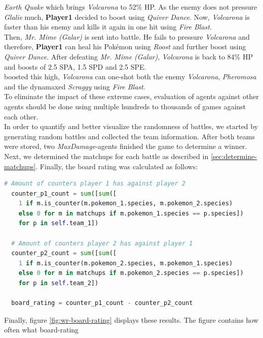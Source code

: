 \textit{Earth Quake} which brings \textit{Volcarona} to 52\% \ac{HP}. As the enemy does not pressure
\textit{Glalie} much, \textbf{Player1} decided to boost using \textit{Quiver Dance}. Now, \textit{Volcarona}
is faster than his enemy and kills it again in one hit using \textit{Fire Blast}. \\
Then, \textit{Mr. Mime (Galar)} is sent into battle. He fails to pressure \textit{Volcarona} and therefore,
\textbf{Player1} can heal his Pokémon using \textit{Roost} and further boost using \textit{Quiver Dance}. After
defeating \textit{Mr. Mime (Galar)}, \textit{Volcarona} is back to 84\% HP and boosts of 2.5 \ac{SPA},
1.5 \ac{SPD} and 2.5 \ac{SPE}. \\
boosted this high, \textit{Volcarona} can one-shot both the enemy \textit{Volcarona},
\textit{Pheromosa} and the dynamaxed \textit{Scraggy} using \textit{Fire Blast}. \\
To eliminate the impact of these extreme cases, evaluation of agents against other agents 
should be done using multiple hundreds to thousands of games against each other. \\
In order to quantify and better visualize the randomness of battles, we started by generating 
 random battles and collected the team information. After
both teams were stored, two \emph{MaxDamage}-agents finished the game to determine a winner.
Next,
we determined the matchups for each battle as described in \ref{sec:determine-matchups}. Finally,
the board rating was calculated as follows:
\begin{lstlisting}[language=Python, caption=Calculate Board rating]
  # Amount of counters player 1 has against player 2
  counter_p1_count = sum([sum([
    1 if m.is_counter(m.pokemon_1.species, m.pokemon_2.species)
    else 0 for m in matchups if m.pokemon_1.species == p.species])
    for p in self.team_1])

  # Amount of counters player 2 has against player 1
  counter_p2_count = sum([sum([
    1 if m.is_counter(m.pokemon_2.species, m.pokemon_1.species)
    else 0 for m in matchups if m.pokemon_2.species == p.species])
    for p in self.team_2])

  board_rating = counter_p1_count - counter_p2_count
\end{lstlisting}
Finally, figure \ref{fig:wr-board-rating} displays these results. The figure contains how often what board-rating
